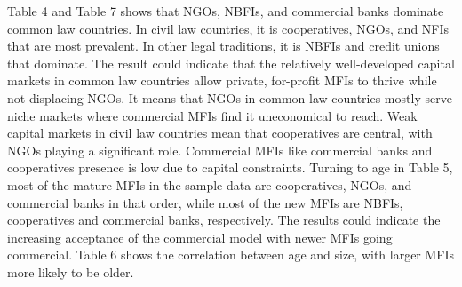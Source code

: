 \documentclass[a4paper,nobind]{templates/ociamthesis}
\begin{document}
Table 4 and Table 7 shows that NGOs, NBFIs, and commercial banks dominate common law countries. In civil law countries, it is cooperatives, NGOs, and NFIs that are most prevalent. In other legal traditions, it is NBFIs and credit unions that dominate. The result could indicate that the relatively well-developed capital markets in common law countries allow private, for-profit MFIs to thrive while not displacing NGOs. It means that NGOs in common law countries mostly serve niche markets where commercial MFIs find it uneconomical to reach. Weak capital markets in civil law countries mean that cooperatives are central, with NGOs playing a significant role. Commercial MFIs like commercial banks and cooperatives presence is low due to capital constraints. Turning to age in Table 5, most of the mature MFIs in the sample data are cooperatives, NGOs, and commercial banks in that order, while most of the new MFIs are NBFIs, cooperatives and commercial banks, respectively. The results could indicate the increasing acceptance of the commercial model with newer MFIs going commercial. Table 6 shows the correlation between age and size, with larger MFIs more likely to be older.
\end{document}
